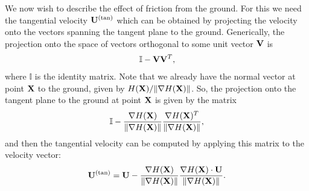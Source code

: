 \documentclass[10pt]{article}
\begin{document}
We now wish to describe the effect of friction from the ground.  For this we need the tangential velocity ${\bf U}^{(\text{tan})}$ which can be obtained by projecting the velocity onto the vectors spanning the tangent plane to the ground.  Generically, the projection onto the space of vectors orthogonal to some unit vector ${\bf V}$ is 
\begin{align*}
\mathbb{I} - {\bf V} {\bf V}^T,
\end{align*}
where $\mathbb{I}$ is the identity matrix.  Note that we already have the normal vector at point ${\bf X}$ to the ground, given by  $H({\bf X}) / \|\nabla H({\bf X})\|$.  So, the projection onto the tangent plane to the ground at point ${\bf X}$ is given by the matrix
\begin{align*}
\mathbb{I} -\frac{\nabla H({\bf X})}{\|\nabla H({\bf X})\|}\frac{\nabla H({\bf X})^T}{\|\nabla H({\bf X})\|},
\end{align*}
and then the tangential velocity can be computed by applying this matrix to the velocity vector:
\begin{align*}
{\bf U}^{(\text{tan})} = {\bf U} -\frac{\nabla H({\bf X})}{\|\nabla H({\bf X})\|}\frac{\nabla H({\bf X}) \cdot {\bf U}}{\|\nabla H({\bf X})\|}.
\end{align*}
\end{document}
